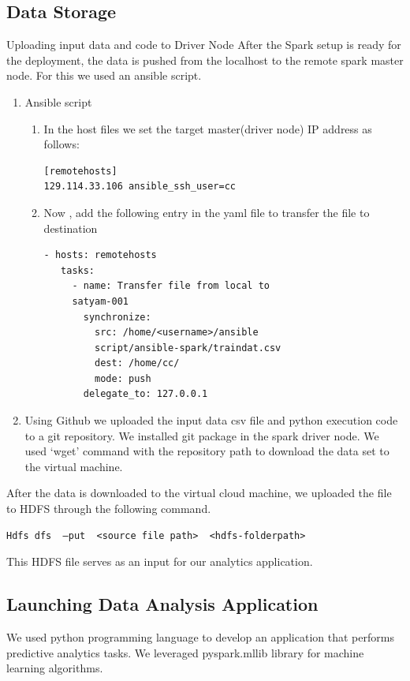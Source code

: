 \documentclass[9pt,twocolumn,twoside]{../../styles/osajnl}
\begin{document}
\subsection{Data Storage}
 Uploading input data and code to Driver Node After the Spark setup is ready for the deployment, the data is pushed from the localhost to the remote spark master node. For this we used an ansible script.
\begin{enumerate}
 \item Ansible script
\begin{enumerate}
 \item In the host files we set the target master(driver node) IP address as follows:
 \begin{verbatim}
[remotehosts]
129.114.33.106 ansible_ssh_user=cc
\end{verbatim}
\item  Now , add the following entry in the yaml file to transfer the file to destination
\begin{verbatim}
- hosts: remotehosts
   tasks:
     - name: Transfer file from local to
     satyam-001
       synchronize:
         src: /home/<username>/ansible
         script/ansible-spark/traindat.csv
         dest: /home/cc/
         mode: push
       delegate_to: 127.0.0.1
\end{verbatim}
\end{enumerate}
\item Using Github we uploaded the input data csv file and python execution code to a git repository. We installed git package in the spark driver node. We used ‘wget’ command  with the repository path to download  the data set to the virtual machine.
\end{enumerate}

 
After the data is downloaded to the virtual cloud machine, we uploaded the file to HDFS through the following command.
\begin{verbatim}
Hdfs dfs  –put  <source file path>  <hdfs-folderpath>
\end{verbatim}

This HDFS file serves as an input for our analytics application.

\subsection{Launching Data Analysis Application}
 We used  python programming language to develop an application that  performs predictive analytics tasks. We leveraged  pyspark.mllib library for machine learning algorithms.
 
\end{document}
